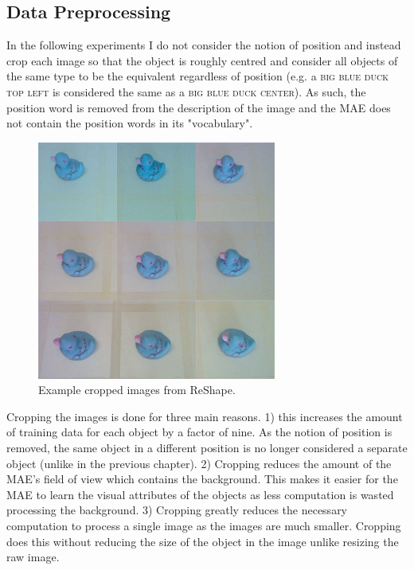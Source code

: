\subsection{Data Preprocessing}

In the following experiments I do not consider the notion of position and instead crop each image so that the object is roughly centred and consider all objects of the same type to be the equivalent regardless of position (e.g. a \textsc{big blue duck top left} is considered the same as a \textsc{big blue duck center}). As such, the position word is removed from the description of the image and the \ac{MAE} does not contain the position words in its "vocabulary".

\begin{figure}[h]
    \centering
    \includegraphics[width=0.7\textwidth]{Figs/chapter6/ReShapeCrop.png}
    \caption{Example cropped images from ReShape.}
    \label{fig:ReShapeCrop}
\end{figure}

Cropping the images is done for three main reasons. 1) this increases the amount of training data for each object by a factor of nine. As the notion of position is removed, the same object in a different position is no longer considered a separate object (unlike in the previous chapter). 2) Cropping reduces the amount of the \ac{MAE}'s field of view which contains the background. This makes it easier for the \ac{MAE} to learn the visual attributes of the objects as less computation is wasted processing the background. 3) Cropping greatly reduces the necessary computation to process a single image as the images are much smaller. Cropping does this without reducing the size of the object in the image unlike resizing the raw image.

